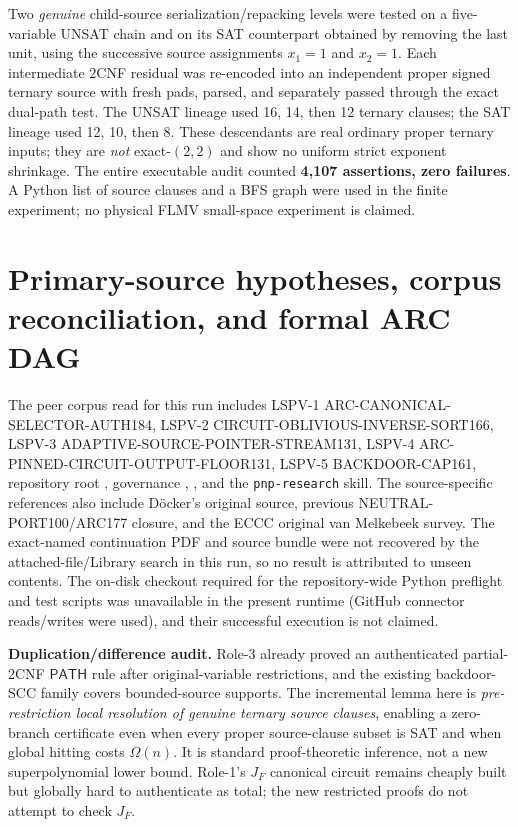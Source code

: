 \documentclass[11pt]{article}
\begin{document}
Two \emph{genuine} child-source serialization/repacking levels were tested on a five-variable UNSAT chain and on its SAT counterpart obtained by removing the last unit, using the successive source assignments $x_1=1$ and $x_2=1$. Each intermediate $2$CNF residual was re-encoded into an independent proper signed ternary source with fresh pads, parsed, and separately passed through the exact dual-path test. The UNSAT lineage used 16, 14, then 12 ternary clauses; the SAT lineage used 12, 10, then 8. These descendants are real ordinary proper ternary inputs; they are \emph{not} exact-$(2,2)$ and show no uniform strict exponent shrinkage. The entire executable audit counted \textbf{4,107 assertions, zero failures}. A Python list of source clauses and a BFS graph were used in the finite experiment; no physical FLMV small-space experiment is claimed.

\section{Primary-source hypotheses, corpus reconciliation, and formal ARC DAG}
The peer corpus read for this run includes LSPV-1 ARC-CANONICAL-SELECTOR-AUTH184, LSPV-2 CIRCUIT-OBLIVIOUS-INVERSE-SORT166, LSPV-3 ADAPTIVE-SOURCE-POINTER-STREAM131, LSPV-4 ARC-PINNED-CIRCUIT-OUTPUT-FLOOR131, LSPV-5 BACKDOOR-CAP161, repository root , governance , , and the \texttt{pnp-research} skill. The source-specific references also include D\"ocker's original source, previous NEUTRAL-PORT100/ARC177 closure, and the ECCC original van Melkebeek survey. The exact-named continuation PDF and source bundle were not recovered by the attached-file/Library search in this run, so no result is attributed to unseen contents. The on-disk checkout required for the repository-wide Python preflight and test scripts was unavailable in the present runtime (GitHub connector reads/writes were used), and their successful execution is not claimed.

\textbf{Duplication/difference audit.} Role-3 already proved an authenticated partial-2CNF $\mathsf{PATH}$ rule after original-variable restrictions, and the existing backdoor-SCC family covers bounded-source supports. The incremental lemma here is \emph{pre-restriction local resolution of genuine ternary source clauses}, enabling a zero-branch certificate even when every proper source-clause subset is SAT and when global hitting costs $\Omega(n)$. It is standard proof-theoretic inference, not a new superpolynomial lower bound. Role-1's $J_F$ canonical circuit remains cheaply built but globally hard to authenticate as total; the new restricted proofs do not attempt to check $J_F$.
\end{document}
